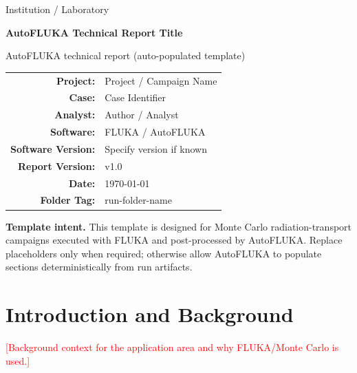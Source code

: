 \documentclass[11pt]{article}
\newcommand{\ReportTitle}{AutoFLUKA Technical Report Title}
\newcommand{\ProjectName}{Project / Campaign Name}
\newcommand{\CaseName}{Case Identifier}
\newcommand{\AuthorName}{Author / Analyst}
\newcommand{\InstitutionName}{Institution / Laboratory}
\newcommand{\ReportDate}{\today}
\newcommand{\ReportVersion}{v1.0}
\newcommand{\SoftwareName}{FLUKA / AutoFLUKA}
\newcommand{\SoftwareVersion}{Specify version if known}
\newcommand{\WorkingFolderTag}{run-folder-name}
\newcommand{\placeholder}[1]{\textcolor{red}{[#1]}}
\begin{document}
\begin{titlepage}
    \hypersetup{pageanchor=false}
    \centering
    {\Large \InstitutionName \par}
    \vspace{1.5cm}
    {\LARGE\bfseries \ReportTitle \par}
    \vspace{0.6cm}
    {\large AutoFLUKA technical report (auto-populated template) \par}
    \vspace{1.5cm}

    \begin{tabular}{rl}
        \textbf{Project:} & \ProjectName \\
        \textbf{Case:} & \CaseName \\
        \textbf{Analyst:} & \AuthorName \\
        \textbf{Software:} & \SoftwareName \\
        \textbf{Software Version:} & \SoftwareVersion \\
        \textbf{Report Version:} & \ReportVersion \\
        \textbf{Date:} & \ReportDate \\
        \textbf{Folder Tag:} & \WorkingFolderTag \\
    \end{tabular}

    \vfill
    \begin{minipage}{0.9\textwidth}
    \small
    \textbf{Template intent.} This template is designed for Monte Carlo radiation-transport campaigns executed with FLUKA and post-processed by AutoFLUKA. Replace placeholders only when required; otherwise allow AutoFLUKA to populate sections deterministically from run artifacts.
    \end{minipage}
\end{titlepage}
\hypersetup{pageanchor=true}

\begin{abstract}
\placeholder{Abstract: brief summary of the problem setup, methodology, main findings, and significance.}
\end{abstract}

\tableofcontents
\newpage

\section{Introduction and Background}
\label{sec:intro}
\placeholder{Background context for the application area and why FLUKA/Monte Carlo is used.}
\end{document}
